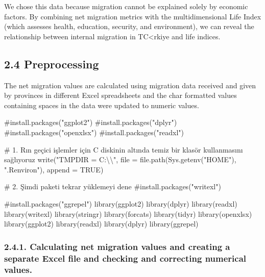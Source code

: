 \documentclass[
  11pt,
  a4paper,
  DIV=11,
  numbers=noendperiod]{scrartcl}
\newenvironment{Shaded}{\begin{snugshade}}{\end{snugshade}}
\newcommand{\AttributeTok}[1]{\textcolor[rgb]{0.40,0.45,0.13}{#1}}
\newcommand{\CommentTok}[1]{\textcolor[rgb]{0.37,0.37,0.37}{#1}}
\newcommand{\ConstantTok}[1]{\textcolor[rgb]{0.56,0.35,0.01}{#1}}
\newcommand{\FunctionTok}[1]{\textcolor[rgb]{0.28,0.35,0.67}{#1}}
\newcommand{\NormalTok}[1]{\textcolor[rgb]{0.00,0.23,0.31}{#1}}
\newcommand{\SpecialCharTok}[1]{\textcolor[rgb]{0.37,0.37,0.37}{#1}}
\newcommand{\StringTok}[1]{\textcolor[rgb]{0.13,0.47,0.30}{#1}}
\begin{document}
We chose this data because migration cannot be explained solely by
economic factors. By combining net migration metrics with the
multidimensional Life Index (which assesses health, education, security,
and environment), we can reveal the relationship between internal
migration in TC\textless rkiye and life indices.

\subsection{2.4 Preprocessing}\label{preprocessing}

The net migration values are calculated using migration data received
and given by provinces in different Excel spreadsheets and the char
formatted values containing spaces in the data were updated to numeric
values.

\begin{Shaded}
\begin{Highlighting}[]
\CommentTok{\#install.packages("ggplot2") }
\CommentTok{\#install.packages("dplyr")   }
\CommentTok{\#install.packages("openxlsx")}
\CommentTok{\#install.packages("readxl")}

\CommentTok{\# 1. R\textquotesingle{}ın geçici işlemler için C diskinin altında temiz bir klasör kullanmasını sağlıyoruz}
\FunctionTok{write}\NormalTok{(}\StringTok{"TMPDIR = C:}\SpecialCharTok{\textbackslash{}\textbackslash{}}\StringTok{"}\NormalTok{, }\AttributeTok{file =} \FunctionTok{file.path}\NormalTok{(}\FunctionTok{Sys.getenv}\NormalTok{(}\StringTok{"HOME"}\NormalTok{), }\StringTok{".Renviron"}\NormalTok{), }\AttributeTok{append =} \ConstantTok{TRUE}\NormalTok{)}

\CommentTok{\# 2. Şimdi paketi tekrar yüklemeyi dene}
\CommentTok{\#install.packages("writexl")}

\CommentTok{\#install.packages("ggrepel")}
\FunctionTok{library}\NormalTok{(ggplot2)}
\FunctionTok{library}\NormalTok{(dplyr)}
\FunctionTok{library}\NormalTok{(readxl) }
\FunctionTok{library}\NormalTok{(writexl) }
\FunctionTok{library}\NormalTok{(stringr)}
\FunctionTok{library}\NormalTok{(forcats)}
\FunctionTok{library}\NormalTok{(tidyr)}
\FunctionTok{library}\NormalTok{(openxlsx)}
\FunctionTok{library}\NormalTok{(ggplot2)}
\FunctionTok{library}\NormalTok{(readxl)}
\FunctionTok{library}\NormalTok{(dplyr)}
\FunctionTok{library}\NormalTok{(ggrepel)}
\end{Highlighting}
\end{Shaded}

\subsubsection{2.4.1. Calculating net migration values and creating a
separate Excel file and checking and correcting numerical
values.}\label{calculating-net-migration-values-and-creating-a-separate-excel-file-and-checking-and-correcting-numerical-values.}
\end{document}
